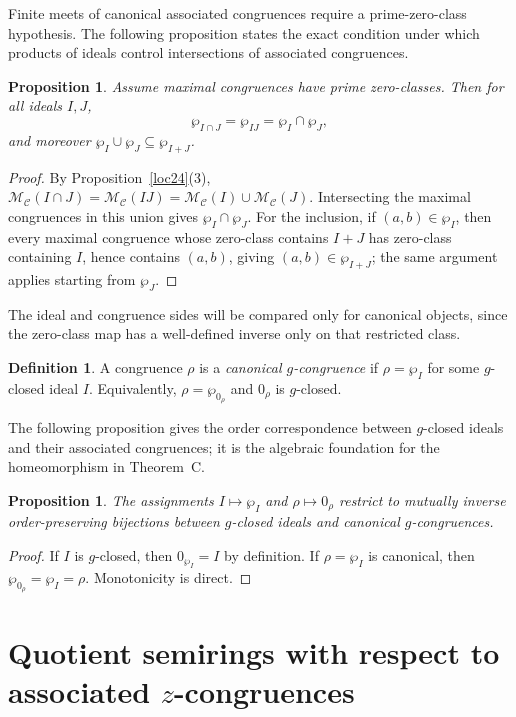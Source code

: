 \documentclass[11pt,leqno]{amsart}
\theoremstyle{plain}
\newtheorem{proposition}[theorem]{Proposition}
\theoremstyle{definition}
\newtheorem{definition}{Definition}[section]
\theoremstyle{remark}
\numberwithin{equation}{section}
\newcommand{\MC}{\mathcal M_{\mathcal C}}
\newcommand{\zero}[1]{0_{#1}}
\begin{document}
Finite meets of canonical associated congruences require
a prime-zero-class hypothesis.
The following proposition states the exact condition under which
products of ideals control intersections of associated congruences.

\begin{proposition}\label{prop:wp-meets}
Assume maximal congruences have prime zero-classes.
Then for all ideals $I,J$,
\[
\wp_{I\cap J}=\wp_{IJ}=\wp_I\cap\wp_J,
\]
and moreover $\wp_I\cup\wp_J\subseteq\wp_{I+J}$.
\end{proposition}
\begin{proof}
By Proposition~\ref{loc24}(3),
$\MC(I\cap J)=\MC(IJ)=\MC(I)\cup\MC(J)$.
Intersecting the maximal congruences in this union gives
$\wp_I\cap\wp_J$.
For the inclusion, if $(a,b)\in\wp_I$, then every maximal congruence
whose zero-class contains $I+J$ has zero-class containing $I$,
hence contains $(a,b)$, giving $(a,b)\in\wp_{I+J}$;
the same argument applies starting from $\wp_J$.
\end{proof}

The ideal and congruence sides will be compared only for canonical
objects, since the zero-class map has a well-defined inverse only
on that restricted class.

\begin{definition}\label{def:g-cong}
A congruence $\rho$ is a \emph{canonical $g$-congruence} if
$\rho=\wp_I$ for some $g$-closed ideal $I$.
Equivalently, $\rho=\wp_{\zero\rho}$ and $\zero\rho$ is $g$-closed.
\end{definition}

The following proposition gives the order correspondence between
$g$-closed ideals and their associated congruences;
it is the algebraic foundation for the homeomorphism in Theorem~C.

\begin{proposition}\label{prop:g-correspondence-basic}
The assignments $I\mapsto\wp_I$ and $\rho\mapsto\zero\rho$ restrict
to mutually inverse order-preserving bijections between
$g$-closed ideals and canonical $g$-congruences.
\end{proposition}
\begin{proof}
If $I$ is $g$-closed, then $\zero{\wp_I}=I$ by definition.
If $\rho=\wp_I$ is canonical, then $\wp_{\zero\rho}=\wp_I=\rho$.
Monotonicity is direct.
\end{proof}

\section{Quotient semirings with respect to associated
\texorpdfstring{$z$}{z}-congruences}\label{sec:quotient}
\end{document}
